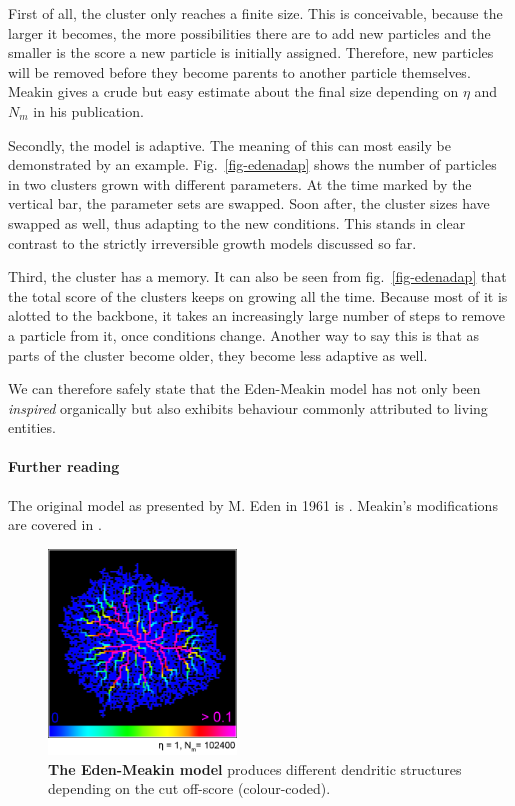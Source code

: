 \documentclass[twocolumn,10pt]{scrartcl}
\begin{document}
        First of all, the cluster only reaches a finite size. This is conceivable, because the larger it
        becomes, the more possibilities there are to add new particles and the smaller is the score a new
        particle is initially assigned. Therefore, new particles will be removed before they become parents
        to another particle themselves. Meakin gives a crude but easy estimate about the final size depending on
        $\eta$ and $N_m$ in his publication.

        Secondly, the model is adaptive. The meaning of this can most easily be demonstrated by an example.
        Fig.~\ref{fig-edenadap} shows the number of particles in two clusters grown with different parameters.
        At the time marked by the vertical bar, the parameter sets are swapped. Soon after, the cluster
        sizes have swapped as well, thus adapting to the new conditions. This stands in clear contrast to the
        strictly irreversible growth models discussed so far.

        Third, the cluster has a memory. It can also be seen from fig.~\ref{fig-edenadap} that the total score
        of the clusters keeps on growing all the time. Because most of it is alotted to the backbone, it
        takes an increasingly large number of steps to remove a particle from it, once conditions change.
        Another way to say this is that as parts of the cluster become older, they become less adaptive as well.

        We can therefore safely state that the Eden-Meakin model has not only been \emph{inspired} organically
        but also exhibits behaviour commonly attributed to living entities.

        {\small
            \paragraph{Further reading}
            The original model as presented by M. Eden in 1961 is \cite{src-eden}. Meakin's modifications are
            covered in \cite{src-meakin-eden}.
        }

        \begin{figure}
            \center
            \includegraphics[width=5cm]{img/eden.png}
            \caption[The Eden-Meakin model]
                {\small\textbf{The Eden-Meakin model} produces different dendritic structures depending on the
                cut off-score (colour-coded).}
            \label{fig-eden}
        \end{figure}
\end{document}
